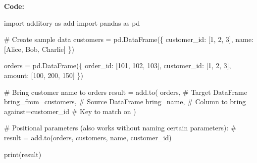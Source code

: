 \documentclass[
  letterpaper,
]{scrbook}
\newenvironment{Shaded}{\begin{snugshade}}{\end{snugshade}}
\newcommand{\BuiltInTok}[1]{\textcolor[rgb]{0.00,0.23,0.31}{#1}}
\newcommand{\CommentTok}[1]{\textcolor[rgb]{0.37,0.37,0.37}{#1}}
\newcommand{\DecValTok}[1]{\textcolor[rgb]{0.68,0.00,0.00}{#1}}
\newcommand{\ImportTok}[1]{\textcolor[rgb]{0.00,0.46,0.62}{#1}}
\newcommand{\NormalTok}[1]{\textcolor[rgb]{0.00,0.23,0.31}{#1}}
\newcommand{\OperatorTok}[1]{\textcolor[rgb]{0.37,0.37,0.37}{#1}}
\newcommand{\StringTok}[1]{\textcolor[rgb]{0.13,0.47,0.30}{#1}}
\begin{document}
\textbf{Code:}

\begin{Shaded}
\begin{Highlighting}[]
\ImportTok{import}\NormalTok{ additory }\ImportTok{as}\NormalTok{ add}
\ImportTok{import}\NormalTok{ pandas }\ImportTok{as}\NormalTok{ pd}

\CommentTok{\# Create sample data}
\NormalTok{customers }\OperatorTok{=}\NormalTok{ pd.DataFrame(\{}
    \StringTok{\textquotesingle{}customer\_id\textquotesingle{}}\NormalTok{: [}\DecValTok{1}\NormalTok{, }\DecValTok{2}\NormalTok{, }\DecValTok{3}\NormalTok{],}
    \StringTok{\textquotesingle{}name\textquotesingle{}}\NormalTok{: [}\StringTok{\textquotesingle{}Alice\textquotesingle{}}\NormalTok{, }\StringTok{\textquotesingle{}Bob\textquotesingle{}}\NormalTok{, }\StringTok{\textquotesingle{}Charlie\textquotesingle{}}\NormalTok{]}
\NormalTok{\})}

\NormalTok{orders }\OperatorTok{=}\NormalTok{ pd.DataFrame(\{}
    \StringTok{\textquotesingle{}order\_id\textquotesingle{}}\NormalTok{: [}\DecValTok{101}\NormalTok{, }\DecValTok{102}\NormalTok{, }\DecValTok{103}\NormalTok{],}
    \StringTok{\textquotesingle{}customer\_id\textquotesingle{}}\NormalTok{: [}\DecValTok{1}\NormalTok{, }\DecValTok{2}\NormalTok{, }\DecValTok{3}\NormalTok{],}
    \StringTok{\textquotesingle{}amount\textquotesingle{}}\NormalTok{: [}\DecValTok{100}\NormalTok{, }\DecValTok{200}\NormalTok{, }\DecValTok{150}\NormalTok{]}
\NormalTok{\})}

\CommentTok{\# Bring customer name to orders}
\NormalTok{result }\OperatorTok{=}\NormalTok{ add.to(}
\NormalTok{    orders,                      }\CommentTok{\# Target DataFrame}
\NormalTok{    bring\_from}\OperatorTok{=}\NormalTok{customers,        }\CommentTok{\# Source DataFrame}
\NormalTok{    bring}\OperatorTok{=}\StringTok{\textquotesingle{}name\textquotesingle{}}\NormalTok{,                }\CommentTok{\# Column to bring}
\NormalTok{    against}\OperatorTok{=}\StringTok{\textquotesingle{}customer\_id\textquotesingle{}}        \CommentTok{\# Key to match on}
\NormalTok{)}

\CommentTok{\# Positional parameters (also works without naming certain parameters):}
\CommentTok{\# result = add.to(orders, customers, \textquotesingle{}name\textquotesingle{}, \textquotesingle{}customer\_id\textquotesingle{})}

\BuiltInTok{print}\NormalTok{(result)}
\end{Highlighting}
\end{Shaded}
\end{document}

